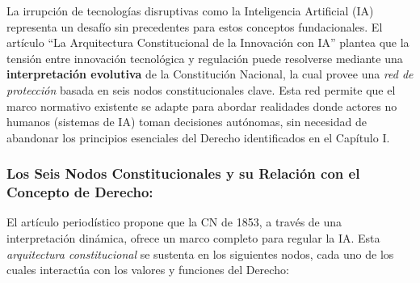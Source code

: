 \documentclass[11pt, a4paper]{article}
\begin{document}
La irrupción de tecnologías disruptivas como la Inteligencia Artificial (IA) representa un desafío sin precedentes para estos conceptos fundacionales. El artículo ``La Arquitectura Constitucional de la Innovación con IA'' \textcite{articulo_ia} plantea que la tensión entre innovación tecnológica y regulación puede resolverse mediante una \textbf{interpretación evolutiva} de la Constitución Nacional, la cual provee una \emph{red de protección} basada en seis nodos constitucionales clave. Esta red permite que el marco normativo existente se adapte para abordar realidades donde actores no humanos (sistemas de IA) toman decisiones autónomas, sin necesidad de abandonar los principios esenciales del Derecho identificados en el Capítulo I.

\subsubsection*{Los Seis Nodos Constitucionales y su Relación con el Concepto de Derecho:}
El artículo periodístico propone que la CN de 1853, a través de una interpretación dinámica, ofrece un marco completo para regular la IA. Esta \emph{arquitectura constitucional} se sustenta en los siguientes nodos, cada uno de los cuales interactúa con los valores y funciones del Derecho:
\end{document}
